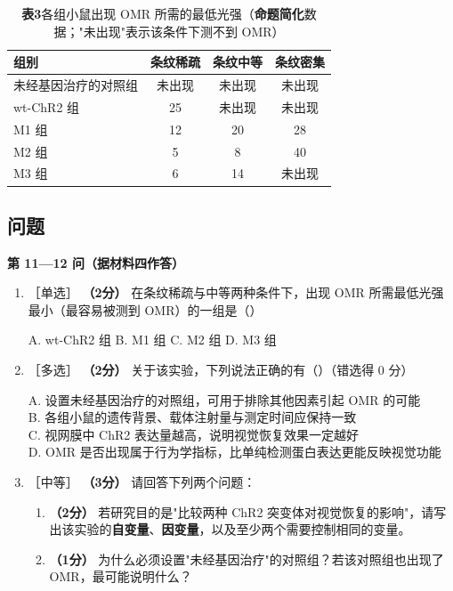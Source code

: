 \documentclass[UTF8,a4paper,11pt]{ctexart}
\newcommand{\pt}[1]{\textbf{（#1分）}}
\newcommand{\lv}[1]{{\small\color{deepgreen}［#1］}}
\newcommand{\key}[1]{\textbf{\color{deepred}#1}}
\newcommand{\choice}[1]{\par\smallskip\noindent #1\par}
\begin{document}
\begin{table}[H]
\centering\small
\caption*{\textbf{表3}\quad 各组小鼠出现 OMR 所需的最低光强（\key{命题简化}数据；"未出现"表示该条件下测不到 OMR）}
\begin{tabular}{@{}lccc@{}}
\toprule
\textbf{组别} & \textbf{条纹稀疏} & \textbf{条纹中等} & \textbf{条纹密集} \\
\midrule
未经基因治疗的对照组 & 未出现 & 未出现 & 未出现 \\
wt-ChR2 组 & 25 & 未出现 & 未出现 \\
M1 组 & 12 & 20 & 28 \\
M2 组 & 5 & 8 & 40 \\
M3 组 & 6 & 14 & 未出现 \\
\bottomrule
\end{tabular}
\end{table}

\subsection*{问题}

\begin{qbox}
\noindent\textbf{\color{deepgreen}第 11—12 问（据材料四作答）}
\begin{enumerate}[leftmargin=2.2em,itemsep=5pt,start=11]
\item \lv{单选} \pt{2} 在条纹稀疏与中等两种条件下，出现 OMR 所需最低光强最小（最容易被测到 OMR）的一组是（\quad）\\
\choice{A. wt-ChR2 组 \quad B. M1 组 \quad C. M2 组 \quad D. M3 组}

\item \lv{多选} \pt{2} 关于该实验，下列说法正确的有（\quad）（错选得 0 分）\\
\choice{A. 设置未经基因治疗的对照组，可用于排除其他因素引起 OMR 的可能\\
B. 各组小鼠的遗传背景、载体注射量与测定时间应保持一致\\
C. 视网膜中 ChR2 表达量越高，说明视觉恢复效果一定越好\\
D. OMR 是否出现属于行为学指标，比单纯检测蛋白表达更能反映视觉功能}

\item \lv{中等} \pt{3} 请回答下列两个问题：
\begin{enumerate}[label=(\arabic*),leftmargin=1.4em,itemsep=2pt]
\item \pt{2} 若研究目的是"比较两种 ChR2 突变体对视觉恢复的影响"，请写出该实验的\textbf{自变量}、\textbf{因变量}，以及至少两个需要控制相同的变量。
\item \pt{1} 为什么必须设置"未经基因治疗"的对照组？若该对照组也出现了 OMR，最可能说明什么？
\end{enumerate}
\end{enumerate}
\end{qbox}
\end{document}

